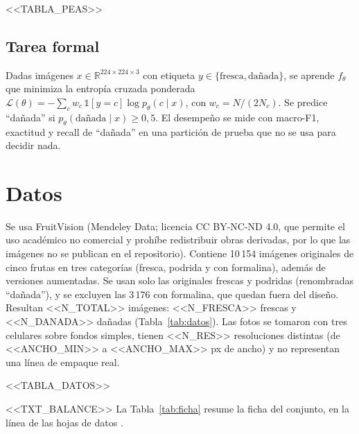 \documentclass[10pt,twocolumn,letterpaper]{article}
\begin{document}
\begin{table}[t]\centering\footnotesize{}\caption{Descripción PEAS del agente.}\label{tab:peas}
\setlength{\tabcolsep}{3pt}<<TABLA_PEAS>>\end{table}
\subsection{Tarea formal}
Dadas imágenes $x\in\mathbb{R}^{224\times224\times3}$ con etiqueta $y\in\{\text{fresca},\text{dañada}\}$, se aprende $f_\theta$ que minimiza la entropía cruzada ponderada $\mathcal{L}(\theta)=-\sum_c w_c\,\mathbb{1}[y=c]\log p_\theta(c\mid x)$, con $w_c=N/(2N_c)$. Se predice ``dañada'' si $p_\theta(\text{dañada}\mid x)\geq 0{,}5$. El desempeño se mide con macro-F1, exactitud y recall de ``dañada'' en una partición de prueba que no se usa para decidir nada.

\section{Datos}
Se usa FruitVision \cite{fv} (Mendeley Data; licencia CC BY-NC-ND 4.0, que permite el uso académico no comercial y prohíbe redistribuir obras derivadas, por lo que las imágenes no se publican en el repositorio). Contiene 10\,154 imágenes originales de cinco frutas en tres categorías (fresca, podrida y con formalina), además de versiones aumentadas. Se usan solo las originales frescas y podridas (renombradas ``dañada''), y se excluyen las 3\,176 con formalina, que quedan fuera del diseño. Resultan <<N_TOTAL>> imágenes: <<N_FRESCA>> frescas y <<N_DANADA>> dañadas (Tabla~\ref{tab:datos}). Las fotos se tomaron con tres celulares sobre fondos simples, tienen <<N_RES>> resoluciones distintas (de <<ANCHO_MIN>> a <<ANCHO_MAX>> px de ancho) y no representan una línea de empaque real.

\begin{table}[t]\centering\footnotesize{}\caption{Imágenes por clase y fruta.}\label{tab:datos}
\setlength{\tabcolsep}{3pt}<<TABLA_DATOS>>\end{table}

<<TXT_BALANCE>> La Tabla~\ref{tab:ficha} resume la ficha del conjunto, en la línea de las hojas de datos \cite{geb}.
\end{document}
